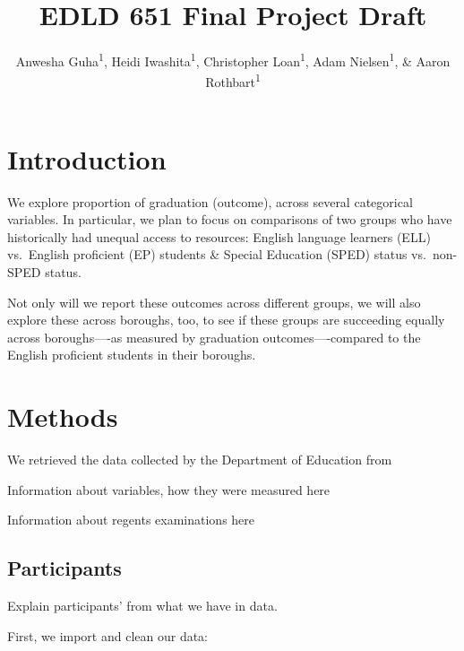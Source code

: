 \documentclass[
  english,
  man, fleqn, noextraspace]{apa6}
\title{EDLD 651 Final Project Draft}
\author{Anwesha Guha\textsuperscript{1}, Heidi Iwashita\textsuperscript{1}, Christopher Loan\textsuperscript{1}, Adam Nielsen\textsuperscript{1}, \& Aaron Rothbart\textsuperscript{1}}
\date{}
\affiliation{\vspace{0.5cm}\textsuperscript{1} University of Oregon}
\newenvironment{Shaded}{\begin{snugshade}}{\end{snugshade}}
\newcommand{\CommentTok}[1]{\textcolor[rgb]{0.56,0.35,0.01}{\textit{#1}}}
\newcommand{\KeywordTok}[1]{\textcolor[rgb]{0.13,0.29,0.53}{\textbf{#1}}}
\newcommand{\NormalTok}[1]{#1}
\newcommand{\OperatorTok}[1]{\textcolor[rgb]{0.81,0.36,0.00}{\textbf{#1}}}
\newcommand{\StringTok}[1]{\textcolor[rgb]{0.31,0.60,0.02}{#1}}
\begin{document}
\maketitle

\hypertarget{introduction}{%
\section{Introduction}\label{introduction}}

We explore proportion of graduation (outcome), across several categorical variables. In particular, we plan to focus on comparisons of two groups who have historically had unequal access to resources: English language learners (ELL) vs.~English proficient (EP) students \& Special Education (SPED) status vs.~non-SPED status.

Not only will we report these outcomes across different groups, we will also explore these across boroughs, too, to see if these groups are succeeding equally across boroughs----as measured by graduation outcomes----compared to the English proficient students in their boroughs.

\hypertarget{methods}{%
\section{Methods}\label{methods}}

We retrieved the data collected by the Department of Education from

Information about variables, how they were measured here

Information about regents examinations here

\hypertarget{participants}{%
\subsection{Participants}\label{participants}}

Explain participants' from what we have in data.

First, we import and clean our data:

\begin{Shaded}
\end{Shaded}
\end{document}
